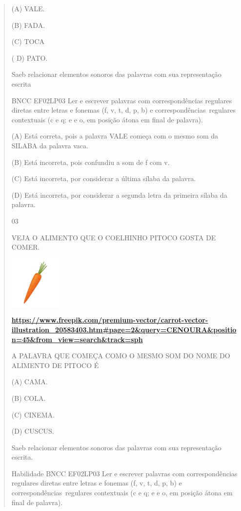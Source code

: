 {{{{\begin{verse}
{{\begin{escolha}
{{{{{(A) VALE.

(B) FADA.

(C) TOCA

( D) PATO.

Saeb relacionar elementos sonoros das palavras com sua representação
escrita

BNCC EF02LP03 Ler e escrever palavras com correspondências regulares
diretas entre letras e fonemas (f, v, t, d, p, b) e
correspondências~regulares contextuais (c e q; e e o, em posição átona
em final de palavra).

\protect\hypertarget{_Hlk129501896}{}{}(A)
\protect\hypertarget{_Hlk129289891}{}{}Está correta, pois a palavra VALE
começa com o mesmo som da SILABA da palavra vaca.

(B) Está incorreta, pois confundiu a som de f com v.

(C) Está incorreta, por considerar a última sílaba da palavra.

(D) Está incorreta, por considerar a segunda letra da primeira sílaba da
palavra.

\num{03}

VEJA O ALIMENTO QUE O COELHINHO PITOCO GOSTA DE COMER.

\includegraphics[width=1.01111in,height=1.01111in]{media/image149.jpeg}

\href{https://www.freepik.com/premium-vector/carrot-vector-illustration_20583403.htm\#page=2\&query=CENOURA\&position=45\&from_view=search\&track=sph}{\textbf{https://www.freepik.com/premium-vector/carrot-vector-illustration\_20583403.htm\#page=2\&query=CENOURA\&position=45\&from\_view=search\&track=sph}}

\protect\hypertarget{_Hlk129504325}{}{}A PALAVRA QUE COMEÇA COMO O MESMO
SOM DO NOME DO ALIMENTO DE PITOCO É

(A) CAMA.

(B) COLA.

(C) CINEMA.

(D) CUSCUS.

Saeb relacionar elementos sonoros das palavras com sua representação
escrita.

Habilidade BNCC EF02LP03 Ler e escrever palavras com correspondências
regulares diretas entre letras e fonemas (f, v, t, d, p, b) e
correspondências~regulares contextuais (c e q; e e o, em posição átona
em final de palavra).

}}}}}
\end{escolha}}}
\end{verse}}}}}
